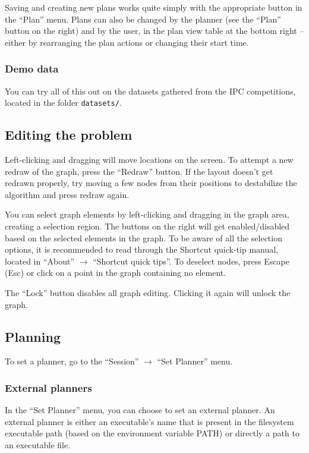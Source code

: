 Saving and creating new plans works quite simply with the appropriate button in the ``Plan'' menu.
Plans can also be changed by the planner (see the ``Plan'' button on the right) and by the user, in the plan view
table at the bottom right -- either by rearranging the plan actions or changing their start time.

\subsubsection*{Demo data}
You can try all of this out on the datasets gathered from the IPC competitions, located in the folder \texttt{datasets/}.

\subsection*{Editing the problem}
Left-clicking and dragging will move locations on the screen. To attempt a new redraw of the graph,
press the ``Redraw'' button. If the layout doesn't get redrawn properly, try moving a few nodes from their
positions to destabilize the algorithm and press redraw again.

You can select graph elements by left-clicking and dragging in the graph area, creating a selection region.
The buttons on the right will get enabled/disabled based on the selected elements in the graph.
To be aware of all the selection options, it is recommended to read through the
Shortcut quick-tip manual, located in ``About'' $\to$ ``Shortcut quick tips''. To deselect nodes,
press Escape (Esc) or click on a point in the graph containing no element.

The ``Lock'' button disables all graph editing. Clicking it again will unlock the graph.

\subsection*{Planning}
To set a planner, go to the ``Session'' $\to$ ``Set Planner'' menu.

\subsubsection*{External planners}
In the ``Set Planner'' menu, you can choose to set an external planner. An external planner is either an
executable's name that is present in the filesystem executable path (based on the environment variable PATH)
or directly a path to an executable file.

